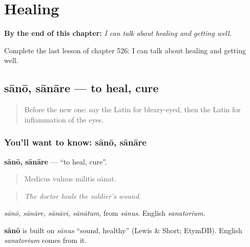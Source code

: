 
\chapter{Healing}
\label{ch:la-healing}

\begin{chapteropening}
\textbf{By the end of this chapter:} \emph{I can talk about healing and getting well.}

Complete the last lesson of chapter 526: I can talk about healing and getting well.
\end{chapteropening}

\section[sānō, sānāre]{sānō, sānāre — to heal, cure}

\label{lesson:LA-C526-sano}



\begin{quote}
Before the new one: say the Latin for bleary-eyed, then the Latin for inflammation of the eyes.
\end{quote}

\subsection*{You'll want to know: sānō, sānāre}
\textbf{sānō, sānāre} — \textquotedblleft{}to heal, cure\textquotedblright{}.

\begin{quote}
Medicus vulnus mīlitis sānat.
\end{quote}

\begin{quote}
\emph{The doctor heals the soldier's wound.}
\end{quote}

\emph{sānō, sānāre, sānāvī, sānātum}, from \emph{sānus}. English \emph{sanatorium}.

\begin{cousinweb}
\textbf{sānō} is built on \emph{sānus} \textquotedblleft{}sound, healthy\textquotedblright{} (Lewis \& Short; EtymDB). English \emph{sanatorium} comes from it.
\end{cousinweb}

